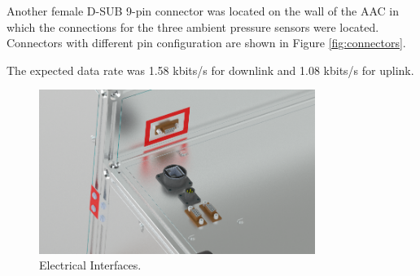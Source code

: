 Another female D-SUB 9-pin connector was located on the wall of the AAC in which the connections for the three ambient pressure sensors were located. Connectors with different pin configuration are shown in Figure \ref{fig:connectors}.

The expected data rate was 1.58 kbits/s for downlink and 1.08 kbits/s for uplink.

\begin{figure}[H]
    \centering
    \includegraphics[width=0.8\textwidth]{4-experiment-design/img/Mechanical/Figure_Detail_Interfaces.png}
    \caption{Electrical Interfaces.}
    \label{fig:electrical_interfaces}
\end{figure}

\raggedbottom
